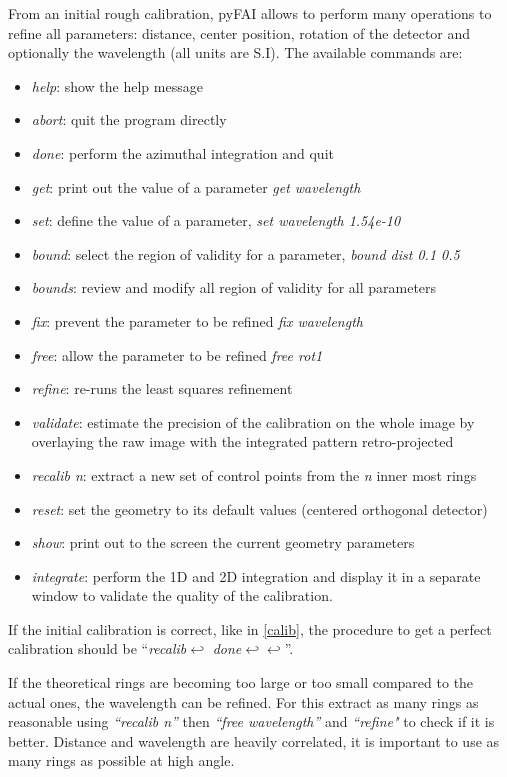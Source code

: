\documentclass[preprint]{iucr}
\begin{document}
From an initial rough calibration, pyFAI allows to perform many operations to
refine all parameters: distance, center position, rotation of the detector and
optionally the wavelength (all units are S.I).
The available commands are:
\begin{itemize}
\item \textit{help}: show the help message
\item \textit{abort}: quit the program directly
\item \textit{done}: perform the azimuthal integration and quit
\item \textit{get}: print out the value of a parameter \textit{get wavelength}
\item \textit{set}: define the value of a parameter, \textit{set wavelength 1.54e-10}
\item \textit{bound}: select the region of validity for a parameter, \textit{bound
dist 0.1 0.5}
\item \textit{bounds}: review and modify all region of validity for all parameters
\item \textit{fix}: prevent the parameter to be refined \textit{fix wavelength}
\item \textit{free}: allow the parameter to be refined \textit{free rot1}
\item \textit{refine}: re-runs the least squares refinement
\item \textit{validate}: estimate the precision of the calibration on the whole
image by overlaying the raw image with the integrated pattern retro-projected
\item \textit{recalib n}: extract a new set of control points from the
\textit{n} inner most rings
\item \textit{reset}: set the geometry to its default values (centered orthogonal detector)
\item \textit{show}: print out to the screen the current geometry parameters
\item \textit{integrate}: perform the 1D and 2D integration and display it in a
separate window to validate the quality of the calibration.
\end{itemize}

If the initial calibration is correct, like in \ref{calib}, the procedure
to get a perfect calibration should be ``\textit{recalib}$\hookleftarrow $
\textit{done}$\hookleftarrow \hookleftarrow $''.

If the theoretical rings are becoming too large or too small compared to the
actual ones, the wavelength can be refined. For this extract as many rings as
reasonable using \textit{``recalib n''} then \textit{``free wavelength''} and
\textit{``refine"} to check if it is better.
Distance and wavelength are
heavily correlated, it is important to use as many rings as possible at high angle.
\end{document}
